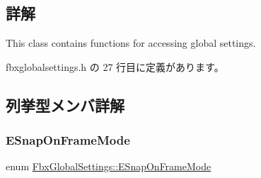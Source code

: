 \subsection{詳解}
This class contains functions for accessing global settings. 

 fbxglobalsettings.\+h の 27 行目に定義があります。



\subsection{列挙型メンバ詳解}
\mbox{\label{class_fbx_global_settings_ada0423e32bb00b73cb43b94d54c54b4a}} 
\subsubsection{\texorpdfstring{E\+Snap\+On\+Frame\+Mode}{ESnapOnFrameMode}}
{\footnotesize\ttfamily enum \hyperlink{class_fbx_global_settings_ada0423e32bb00b73cb43b94d54c54b4a}{Fbx\+Global\+Settings\+::\+E\+Snap\+On\+Frame\+Mode}}

